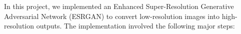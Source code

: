 



In this project, we implemented an Enhanced Super-Resolution Generative Adversarial Network (ESRGAN) to convert low-resolution images into high-resolution outputs. The implementation involved the following major steps:

